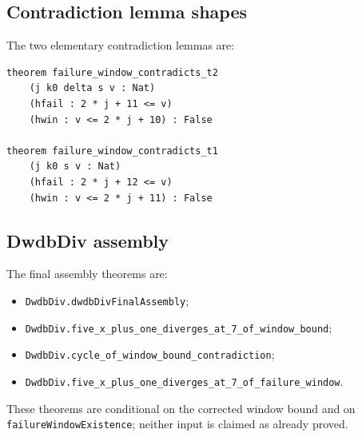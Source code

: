 \subsection{Contradiction lemma shapes}

The two elementary contradiction lemmas are:
\begin{verbatim}
theorem failure_window_contradicts_t2
    (j k0 delta s v : Nat)
    (hfail : 2 * j + 11 <= v)
    (hwin : v <= 2 * j + 10) : False

theorem failure_window_contradicts_t1
    (j k0 s v : Nat)
    (hfail : 2 * j + 12 <= v)
    (hwin : v <= 2 * j + 11) : False
\end{verbatim}

\subsection{DwdbDiv assembly}

The final assembly theorems are:
\begin{itemize}[leftmargin=*]
\item \texttt{DwdbDiv.dwdbDivFinalAssembly};
\item \texttt{DwdbDiv.five\_x\_plus\_one\_diverges\_at\_7\_of\_window\_bound};
\item \texttt{DwdbDiv.cycle\_of\_window\_bound\_contradiction};
\item \texttt{DwdbDiv.five\_x\_plus\_one\_diverges\_at\_7\_of\_failure\_window}.
\end{itemize}

These theorems are conditional on the corrected window bound and on
\texttt{failureWindowExistence}; neither input is claimed as already
proved.
